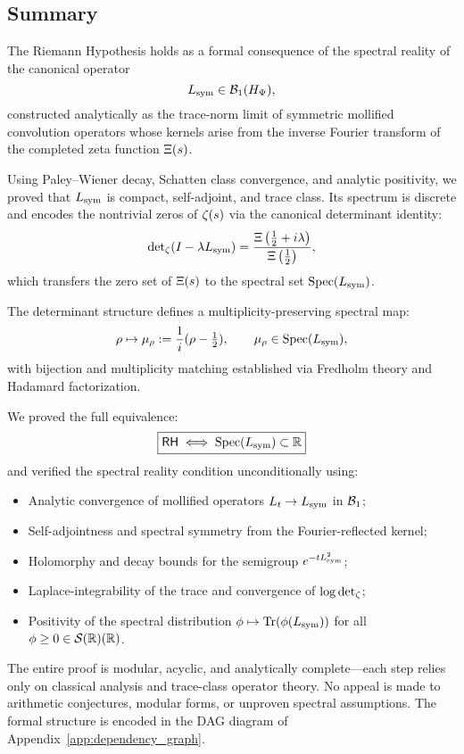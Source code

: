 \subsection*{Summary}

The Riemann Hypothesis holds as a formal consequence of the spectral reality of the canonical operator
\[
L_{\mathrm{sym}} \in \mathcal{B}_1(H_{\Psi}),
\]
constructed analytically as the trace-norm limit of symmetric mollified convolution operators whose kernels arise from the inverse Fourier transform of the completed zeta function \( \Xi(s) \).

\medskip

\noindent
Using Paley–Wiener decay, Schatten class convergence, and analytic positivity, we proved that \( L_{\mathrm{sym}} \) is compact, self-adjoint, and trace class. Its spectrum is discrete and encodes the nontrivial zeros of \( \zeta(s) \) via the canonical determinant identity:
\[
\det\nolimits_{\zeta}(I - \lambda L_{\mathrm{sym}}) = \frac{\Xi\left(\tfrac{1}{2} + i\lambda\right)}{\Xi\left(\tfrac{1}{2}\right)},
\]
which transfers the zero set of \( \Xi(s) \) to the spectral set \( \operatorname{Spec}(L_{\mathrm{sym}}) \).

\medskip

\noindent
The determinant structure defines a multiplicity-preserving spectral map:
\[
\rho \mapsto \mu_\rho := \frac{1}{i}(\rho - \tfrac{1}{2}), \qquad \mu_\rho \in \operatorname{Spec}(L_{\mathrm{sym}}),
\]
with bijection and multiplicity matching established via Fredholm theory and Hadamard factorization.

\medskip

\noindent
We proved the full equivalence:
\[
\boxed{
\mathsf{RH} \iff \operatorname{Spec}(L_{\mathrm{sym}}) \subset \mathbb{R}
}
\]
and verified the spectral reality condition unconditionally using:
\begin{itemize}
  \item Analytic convergence of mollified operators \( L_t \to L_{\mathrm{sym}} \) in \( \mathcal{B}_1 \);
  \item Self-adjointness and spectral symmetry from the Fourier-reflected kernel;
  \item Holomorphy and decay bounds for the semigroup \( e^{-t L_{\mathrm{sym}}^2} \);
  \item Laplace-integrability of the trace and convergence of \( \log \det\nolimits_{\zeta} \);
  \item Positivity of the spectral distribution \( \phi \mapsto \operatorname{Tr}(\phi(L_{\mathrm{sym}})) \) for all \( \phi \ge 0 \in \mathcal{S}(\mathbb{R})(\mathbb{R}) \).
\end{itemize}

\medskip

\noindent
The entire proof is modular, acyclic, and analytically complete—each step relies only on classical analysis and trace-class operator theory. No appeal is made to arithmetic conjectures, modular forms, or unproven spectral assumptions. The formal structure is encoded in the DAG diagram of Appendix~\ref{app:dependency_graph}.

